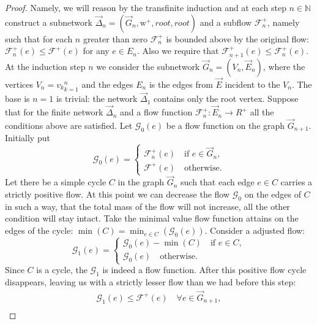 \documentclass[12pt]{article}
\renewcommand{\cal}[1]{\mathcal{#1}}
\renewcommand{\leq}{\leqslant}
\theoremstyle{definition}
\newcommand{\wtp}{\mathrm{w}^{+}}
\newcommand{\flowpos}{\mathcal{F}^{+}}
\newcommand{\flowposn}[1]{\mathcal{F}_{#1}^{+}}
\renewcommand{\root}{\mathit{root}}
\newcommand{\onet}{\vec{\Delta}}
\numberwithin{remark}{section}
\numberwithin{theorem}{section}
\numberwithin{prop}{section}
\numberwithin{equation}{section}
\numberwithin{lemma}{section}
\numberwithin{prop_under_lemma}{lemma}
\begin{document}
\begin{proof}
      Namely, we will reason by the transfinite induction and at each step $n \in \mathbb{N}$ construct a subnetwork
        $\onet_n = (\vec{G}_n, \wtp, \root, \root)$ and a subflow $\flowposn{n}$, namely such that for each $n$ greater than zero 
        $\flowposn{n}$ is bounded above by the original flow: $\flowposn{n}(e) \leq \flowpos(e)$ for any $e \in E_n$.
      Also we require that $\flowposn{n+1}(e) \leq \flowposn{n}(e)$.
      At the induction step $n$ we consider the subnetwork $\vec{G}_n = (V_n, \vec{E}_n)$, where the vertices
        $V_n = {v_k}_{k=1}^n$ and the edges $E_n$ is the edges from $\vec{E}$ incident to the $V_n$.
      The base is $n = 1$ is trivial: the network $\onet_1$ contains only the root vertex.
      Suppose that for the finite network $\onet_n$ and a flow function $\flowposn{n}: \vec{E}_n \to R^{+}$ 
        all the conditions above are satisfied.
      Let $\cal{G}_0(e)$ be a flow function on the graph $\vec{G}_{n+1}$.
      Initially put 
      \begin{equation*}
        \cal{G}_0(e) =
        \begin{cases}
          \flowposn{n}(e) \quad \text{if } e \in \vec{G}_n,\\
          \flowpos(e) \quad \text{otherwise}.
        \end{cases}
      \end{equation*}
      Let there be a simple cycle $C$ in the graph $\vec{G}_n$ such that each edge $e \in C$ carries
        a strictly positive flow.
      At this point we can decrease the flow $\cal{G}_0$ on the edges of $C$ in such a way, that the total mass
        of the flow will not increase, all the other condition will stay intact.
      Take the minimal value flow function attains on the edges of the cycle: $\displaystyle\min(C) = \min_{e \in C}\left(\cal{G}_0(e)\right)$.
      Consider a adjusted flow:
      \begin{equation*}
        \cal{G}_1(e) =
        \begin{cases}
          \cal{G}_0(e) - \min(C) \quad \text{if } e \in C,\\
          \cal{G}_0(e) \quad \text{otherwise}.
        \end{cases}
      \end{equation*}
      Since $C$ is a cycle, the $\cal{G}_1$ is indeed a flow function.
      After this positive flow cycle disappears, leaving us with a strictly lesser flow than we had before this step:
      \begin{align*}
        \cal{G}_1(e) \leq \flowpos(e) \quad \forall e \in \vec{G}_{n+1},\\

\end{align*}
\end{proof}
\end{document}
